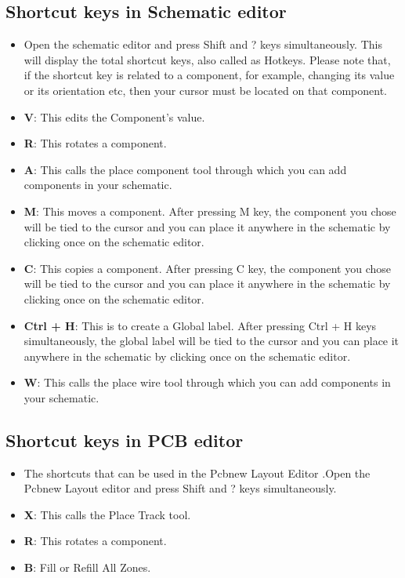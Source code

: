   \subsection{ Shortcut keys in Schematic editor }
     \begin {itemize}
\item Open the schematic editor and press Shift and ? keys simultaneously. This will display the total shortcut keys, also called as Hotkeys. Please note that, if the shortcut key is related to a component, for example, changing its value or its orientation etc, then your cursor must be located on that component.
\item {\textbf{V}}: This edits the Component’s value.
\item {\textbf{R}}: This rotates a component. 
\item{\textbf{A}}: This calls the place component tool through which you can add components in your schematic. 
\item{\textbf{M}}: This moves a component. After pressing M key, the component you chose will be tied to the cursor and you can place it anywhere in the schematic by clicking once on the schematic editor. 
\item{\textbf{C}}: This copies a component. After pressing C key, the component you chose will be tied to the cursor and you can place it anywhere in the schematic by clicking once on the schematic editor. 
\item{\textbf{Ctrl + H}}: This is to create a Global label. After pressing Ctrl + H keys simultaneously, the global label will be tied to the cursor and you can place it anywhere in the schematic by clicking once on the schematic editor. 
\item{\textbf{W}}: This calls the place wire tool through which you can add components in your schematic. 

\end {itemize}

\subsection{ Shortcut keys in PCB editor}

\begin {itemize}
\item The shortcuts that can be used in the Pcbnew Layout Editor .Open the Pcbnew Layout editor and press Shift and ? keys simultaneously.

\item {\textbf{X}}: This calls the Place Track tool. 
\item {\textbf{R}}: This rotates a component. 
\item{\textbf{B}}: Fill or Refill All Zones. 

\end {itemize}

